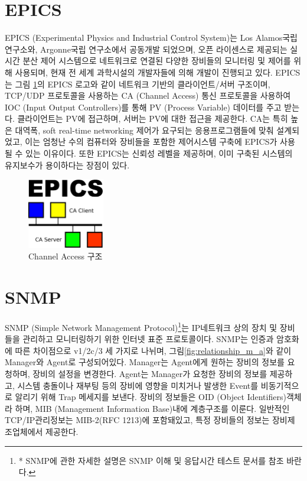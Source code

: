 \documentclass[11pt
  , a4paper
  , article
  , oneside
]{memoir}
\begin{document}
\section{EPICS}
EPICS (Experimental Physics and Industrial Control System)는 Los Alamos국립 연구소와, Argonne국립 연구소에서 공동개발 되었으며, 오픈 라이센스로 제공되는 실시간 분산 제어 시스템으로 네트워크로 연결된 다양한 장비들의 모니터링 및 제어를 위해 사용되며, 현재 전 세계 과학시설의 개발자들에 의해 개발이 진행되고 있다. EPICS는 그림 \ref{fig:ca}의 EPICS 로고와 같이 네트워크 기반의 클라이언트/서버 구조이며, TCP/UDP 프로토콜을 사용하는 CA (Channel Access) 통신 프로토콜을 사용하여 IOC (Input Output Controllers)를 통해 PV (Process Variable) 데이터를 주고 받는다. 클라이언트는 PV에 접근하며, 서버는 PV에 대한 접근을 제공한다. CA는 특히 높은 대역폭, soft real-time networking 제어가 요구되는 응용프로그램들에 맞춰 설계되었고, 이는 엄청난 수의 컴퓨터와 장비들을 포함한 제어시스템 구축에 EPICS가 사용될 수 있는 이유이다. 또한 EPICS는 신뢰성 레벨을 제공하며, 이미 구축된 시스템의 유지보수가 용이하다는 장점이 있다\citep{epics}. 

\begin{figure}[h!]
  \centering
  \includegraphics[width=0.3\textwidth]{./images/epics.eps}
  \caption{Channel Access 구조}
  \label{fig:ca}   
\end{figure}

\section{SNMP}
SNMP (Simple Network Management Protocol)\footnote{* SNMP에 관한 자세한 설명은 SNMP 이해 및 응답시간 테스트 문서를 참조 바란다.}는 IP네트워크 상의 장치 및 장비들을 관리하고 모니터링하기 위한 인터넷 표준 프로토콜이다\citep{snmp}. SNMP는 인증과 암호화에 따른 차이점으로 v1/2c/3 세 가지로 나뉘며, 그림\ref{fig:relationship_m_a}와 같이 Manager와 Agent로 구성되어있다\citep{snmpm_a}. Manager는 Agent에게 원하는 장비의 정보를 요청하며, 장비의 설정을 변경한다. Agent는 Manager가 요청한 장비의 정보를 제공하고, 시스템 충돌이나 재부팅 등의 장비에 영향을 미치거나 발생한 Event를 비동기적으로 알리기 위해 Trap 메세지를 보낸다. 장비의 정보들은 OID (Object Identifiers)객체라 하며, MIB (Management Information Base)내에 계층구조를 이룬다. 일반적인 TCP/IP관리정보는 MIB-2(RFC 1213)에 포함돼있고, 특정 장비들의 정보는 장비제조업체에서 제공한다. 
\end{document}
